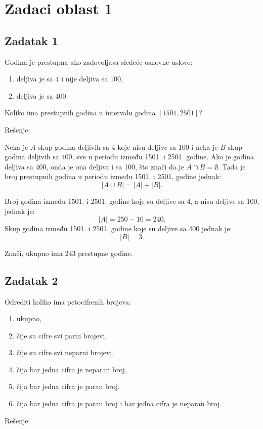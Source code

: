 \documentclass[a4paper,12pt]{article}
\begin{document}
\section*{Zadaci oblast 1}

\subsection*{Zadatak 1}
Godina je prestupna ako zadovoljava sledeće osnovne uslove:
\begin{enumerate}
    \item deljiva je sa 4 i nije deljiva sa 100,
    \item deljiva je sa 400.
\end{enumerate}

Koliko ima prestupnih godina u intervalu godina $[1501, 2501]$?

Rešenje:

Neka je $A$ skup godina deljivih sa 4 koje nisu deljive sa 100 i neka je $B$ skup godina deljivih sa 400, sve u periodu između 1501. i 2501. godine. Ako je godina deljiva sa 400, onda je ona deljiva i sa 100, što znači da je $A \cap B = \emptyset$. Tada je broj prestupnih godina u periodu između 1501. i 2501. godine jednak:
\[
|A \cup B| = |A| + |B|.
\]

Broj godina između 1501. i 2501. godine koje su deljive sa 4, a nisu deljive sa 100, jednak je:
\[
|A| = 250 - 10 = 240.
\]
Skup godina između 1501. i 2501. godine koje su deljive sa 400 jednak je:
\[
|B| = 3.
\]

Znači, ukupno ima $243$ prestupne godine.


\subsection*{Zadatak 2}
Odrediti koliko ima petocifrenih brojeva:
\begin{enumerate}
    \item ukupno,
    \item čije su cifre svi parni brojevi,
    \item čije su cifre svi neparni brojevi,
    \item čija bar jedna cifra je neparan broj,
    \item čija bar jedna cifra je paran broj,
    \item čija bar jedna cifra je paran broj i bar jedna cifra je neparan broj.
\end{enumerate}

Rešenje:
\end{document}
